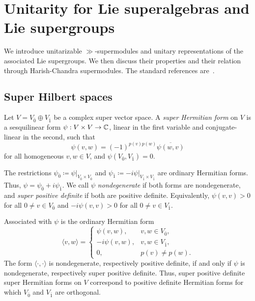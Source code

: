 \section{Unitarity for Lie superalgebras and Lie supergroups}\label{sec::unitarity}
\noindent
We introduce unitarizable $\gg$-supermodules and unitary representations of the associated Lie supergroups. We then discuss their properties and their relation through Harish-Chandra supermodules. The standard references are~\cite{jakobsen1994full, neeb2011lie, Carmeli_Fioresi_Varadarajan_Unitary}.

\subsection{Super Hilbert spaces}

Let $V=V_{\bar0}\oplus V_{\bar1}$ be a complex super vector space. A \emph{super Hermitian form} on $V$ is a sesquilinear form $\psi:V\times V\to{\mathbb C}$, linear in the first variable and conjugate-linear in the second, such that
\begin{equation}
\psi(v,w)=(-1)^{p(v)p(w)}\overline{\psi(w,v)}
\end{equation}
for all homogeneous $v,w\in V$, and $\psi(V_{\bar0},V_{\bar1})=0$.

The restrictions
$
\psi_{\bar0}\coloneqq\psi|_{V_{\bar0}\times V_{\bar0}}
$
and
$
\psi_{\bar1}\coloneqq-i\psi|_{V_{\bar1}\times V_{\bar1}}
$
are ordinary Hermitian forms. Thus, $\psi=\psi_{\bar0}+i\psi_{\bar1}$. We call $\psi$ \emph{nondegenerate} if both forms are nondegenerate, and \emph{super positive definite} if both are positive definite. Equivalently,
$
\psi(v,v)>0
$
for all $0\neq v\in V_{\bar0}$ and
$
-i\psi(v,v)>0
$
for all $0\neq v\in V_{\bar1}$.

Associated with $\psi$ is the ordinary Hermitian form
\begin{equation}
\langle v,w\rangle
=
\begin{cases}
\psi(v,w),&v,w\in V_{\bar0},\\
-i\psi(v,w),&v,w\in V_{\bar1},\\
0,&p(v)\neq p(w).
\end{cases}
\end{equation}
The form $\langle\cdot,\cdot\rangle$ is nondegenerate, respectively positive definite, if and only if $\psi$ is nondegenerate, respectively super positive definite. Thus, super positive definite super Hermitian forms on $V$ correspond to positive definite Hermitian forms for which $V_{\bar0}$ and $V_{\bar1}$ are orthogonal.

